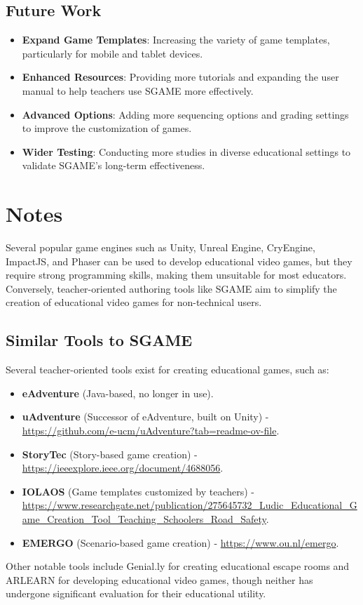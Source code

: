 \subsection{Future Work}
\begin{itemize}
    \item \textbf{Expand Game Templates}: Increasing the variety of game templates, particularly for mobile and tablet devices.
    \item \textbf{Enhanced Resources}: Providing more tutorials and expanding the user manual to help teachers use SGAME more effectively.
    \item \textbf{Advanced Options}: Adding more sequencing options and grading settings to improve the customization of games.
    \item \textbf{Wider Testing}: Conducting more studies in diverse educational settings to validate SGAME's long-term effectiveness.
\end{itemize}

\section{Notes}
Several popular game engines such as Unity, Unreal Engine, CryEngine, ImpactJS, and Phaser can be used to develop educational video games, but they require strong programming skills, making them unsuitable for most educators. Conversely, teacher-oriented authoring tools like SGAME aim to simplify the creation of educational video games for non-technical users.

\subsection{Similar Tools to SGAME}
Several teacher-oriented tools exist for creating educational games, such as:
\begin{itemize}
    \item \textbf{eAdventure} (Java-based, no longer in use).
    \item \textbf{uAdventure} (Successor of eAdventure, built on Unity) - \url{https://github.com/e-ucm/uAdventure?tab=readme-ov-file}.
    \item \textbf{StoryTec} (Story-based game creation) - \url{https://ieeexplore.ieee.org/document/4688056}.
    \item \textbf{IOLAOS} (Game templates customized by teachers) - \url{https://www.researchgate.net/publication/275645732_Ludic_Educational_Game_Creation_Tool_Teaching_Schoolers_Road_Safety}.
    \item \textbf{EMERGO} (Scenario-based game creation) - \url{https://www.ou.nl/emergo}.
\end{itemize}

Other notable tools include Genial.ly for creating educational escape rooms and ARLEARN for developing educational video games, though neither has undergone significant evaluation for their educational utility.
